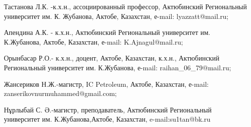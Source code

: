 \begin{noparindent}
Тастанова Л.К. -к.х.н., ассоциированный профессор, Актюбинский
Региональный университет им. К. Жубанова, Актобе, Казахстан, е-mail:
lyazzatt@mail.ru;

Апендина А.К. - к.х.н., Актюбинский Региональный университет им.
К.Жубанова, Актобе, Казахстан, е-mail: K.Ajnagul@mail.ru;

Орынбасар Р.О.- к.х.н., доцент, Актобе, Казахстан, к.х.н., Актюбинский
Региональный университет им. К.Жубанова, е-mail: raihan\_06\_79@mail.ru;

Жансериков Н.Ж.-магистр, IC Petroleum, Актобе, Казахстан, е-mail:
zanserikovnurmuhammed@gmail.com;

Нұрлыбай С. Ә.-магистр, преподаватель, Актюбинский Региональный
университет им. К.Жубанова,Актобе, Казахстан, e-mail:su1tan@bk.ru
\end{noparindent}
